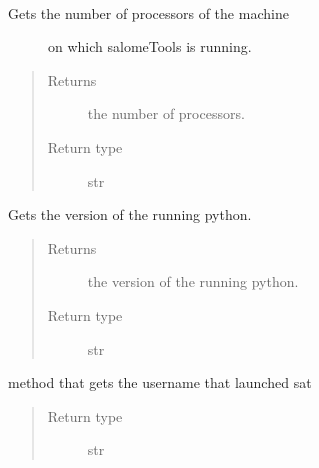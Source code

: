 \documentclass[a4paper,10pt,english]{sphinxmanual}
\begin{document}

\begin{fulllineitems}
\label{commands/apidoc/src:src.architecture.get_nb_proc}~\begin{description}
\item[{Gets the number of processors of the machine }] \leavevmode
on which salomeTools is running.

\end{description}
\begin{quote}\begin{description}
\item[{Returns}] \leavevmode
the number of processors.

\item[{Return type}] \leavevmode
str

\end{description}\end{quote}

\end{fulllineitems}


\begin{fulllineitems}
\label{commands/apidoc/src:src.architecture.get_python_version}
Gets the version of the running python.
\begin{quote}\begin{description}
\item[{Returns}] \leavevmode
the version of the running python.

\item[{Return type}] \leavevmode
str

\end{description}\end{quote}

\end{fulllineitems}


\begin{fulllineitems}
\label{commands/apidoc/src:src.architecture.get_user}
method that gets the username that launched sat
\begin{quote}\begin{description}
\item[{Return type}] \leavevmode
str

\end{description}\end{quote}

\end{fulllineitems}
\end{document}
